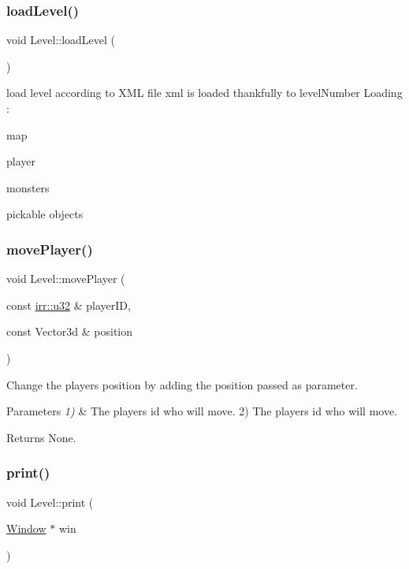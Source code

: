 \subsubsection{\texorpdfstring{load\+Level()}{loadLevel()}}
{\footnotesize\ttfamily void Level\+::load\+Level (\begin{DoxyParamCaption}{ }\end{DoxyParamCaption})}

load level according to X\+ML file xml is loaded thankfully to level\+Number Loading \+:
\begin{DoxyItemize}
\item map
\item player
\item monsters
\item pickable objects 
\end{DoxyItemize}\mbox{\label{classLevel_ac679a141274c19107c288fe40b967e95}} 
\subsubsection{\texorpdfstring{move\+Player()}{movePlayer()}}
{\footnotesize\ttfamily void Level\+::move\+Player (\begin{DoxyParamCaption}\item[{const \hyperlink{namespaceirr_a0416a53257075833e7002efd0a18e804}{irr\+::u32} \&}]{player\+ID,  }\item[{const Vector3d \&}]{position }\end{DoxyParamCaption})}



Change the player\textquotesingle{}s position by adding the position passed as parameter. 


\begin{DoxyParams}{Parameters}
{\em 1)} & The player\textquotesingle{}s id who will move. 2) The player\textquotesingle{}s id who will move.\\
\hline
\end{DoxyParams}
\begin{DoxyReturn}{Returns}
None. 
\end{DoxyReturn}
\mbox{\label{classLevel_ab8311fe64b7957d627053359331b0b6b}} 
\subsubsection{\texorpdfstring{print()}{print()}}
{\footnotesize\ttfamily void Level\+::print (\begin{DoxyParamCaption}\item[{\hyperlink{classWindow}{Window} $\ast$}]{win }\end{DoxyParamCaption})\hspace{0.3cm}{\ttfamily [virtual]}}



